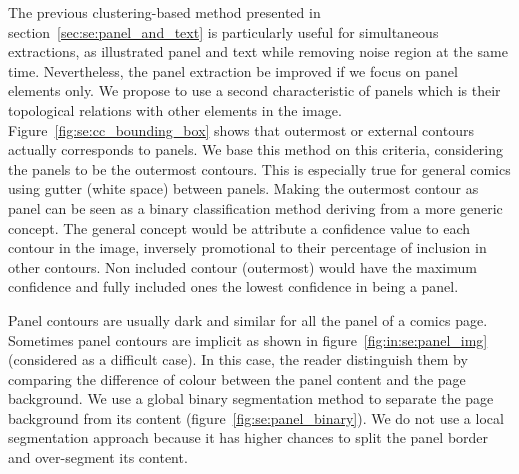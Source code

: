 The previous clustering-based method presented in section~\ref{sec:se:panel_and_text} is particularly useful for simultaneous extractions, as illustrated panel and text while removing noise region at the same time.
Nevertheless, the panel extraction be improved if we focus on panel elements only.
We propose to use a second characteristic of panels which is their topological relations with other elements in the image.
Figure~\ref{fig:se:cc_bounding_box} shows that outermost or external contours actually corresponds to panels.
We base this method on this criteria, considering the panels to be the outermost contours.
This is especially true for general comics using gutter (white space) between panels.
Making the outermost contour as panel can be seen as a binary classification method deriving from a more generic concept.
The general concept would be attribute a confidence value to each contour in the image, inversely promotional to their percentage of inclusion in other contours.
Non included contour (outermost) would have the maximum confidence and fully included ones the lowest confidence in being a panel.


Panel contours are usually dark and similar for all the panel of a comics page.
Sometimes panel contours are implicit as shown in figure~\ref{fig:in:se:panel_img} (considered as a difficult case).
In this case, the reader distinguish them by comparing the difference of colour between the panel content and the page background.
We use a global binary segmentation method to separate the page background from its content (figure~\ref{fig:se:panel_binary}).
We do not use a local segmentation approach because it has higher chances to split the panel border and over-segment its content.

